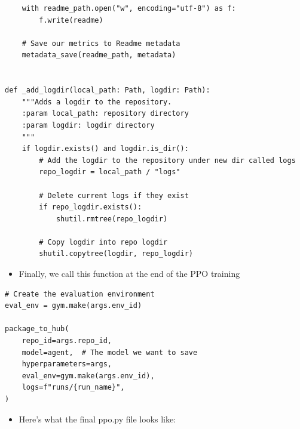 \documentclass[11pt,a4paper]{article}
\begin{document}
\begin{lstlisting}
    with readme_path.open("w", encoding="utf-8") as f:
        f.write(readme)

    # Save our metrics to Readme metadata
    metadata_save(readme_path, metadata)


def _add_logdir(local_path: Path, logdir: Path):
    """Adds a logdir to the repository.
    :param local_path: repository directory
    :param logdir: logdir directory
    """
    if logdir.exists() and logdir.is_dir():
        # Add the logdir to the repository under new dir called logs
        repo_logdir = local_path / "logs"

        # Delete current logs if they exist
        if repo_logdir.exists():
            shutil.rmtree(repo_logdir)

        # Copy logdir into repo logdir
        shutil.copytree(logdir, repo_logdir)
\end{lstlisting}

\begin{itemize}
\tightlist
\item
  Finally, we call this function at the end of the PPO training
\end{itemize}

\begin{lstlisting}
# Create the evaluation environment
eval_env = gym.make(args.env_id)

package_to_hub(
    repo_id=args.repo_id,
    model=agent,  # The model we want to save
    hyperparameters=args,
    eval_env=gym.make(args.env_id),
    logs=f"runs/{run_name}",
)
\end{lstlisting}

\begin{itemize}
\tightlist
\item
  Here's what the final ppo.py file looks like:
\end{itemize}
\end{document}

